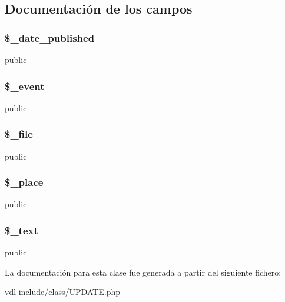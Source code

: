 \subsection{Documentación de los campos}
\hypertarget{class_u_p_d_a_t_e_a18eb2ed8e237cc8ea4ab9beff2ac576a}{
\subsubsection[{\$\-\_\-date\-\_\-published}]{\setlength{\rightskip}{0pt plus 5cm}\$\-\_\-date\-\_\-published}}\label{class_u_p_d_a_t_e_a18eb2ed8e237cc8ea4ab9beff2ac576a}
public \hypertarget{class_u_p_d_a_t_e_ad6c677c9355a932f4eb84a01ddf072c4}{
\subsubsection[{\$\-\_\-event}]{\setlength{\rightskip}{0pt plus 5cm}\$\-\_\-event}}\label{class_u_p_d_a_t_e_ad6c677c9355a932f4eb84a01ddf072c4}
public \hypertarget{class_u_p_d_a_t_e_abddaf0b77086e2b7d920f5d1a9616889}{
\subsubsection[{\$\-\_\-file}]{\setlength{\rightskip}{0pt plus 5cm}\$\-\_\-file}}\label{class_u_p_d_a_t_e_abddaf0b77086e2b7d920f5d1a9616889}
public \hypertarget{class_u_p_d_a_t_e_a7c2710f8add9b3b64b8f85f8d06d3687}{
\subsubsection[{\$\-\_\-place}]{\setlength{\rightskip}{0pt plus 5cm}\$\-\_\-place}}\label{class_u_p_d_a_t_e_a7c2710f8add9b3b64b8f85f8d06d3687}
public \hypertarget{class_u_p_d_a_t_e_a30dbc932171e87783bf0630dcdb5ad36}{
\subsubsection[{\$\-\_\-text}]{\setlength{\rightskip}{0pt plus 5cm}\$\-\_\-text}}\label{class_u_p_d_a_t_e_a30dbc932171e87783bf0630dcdb5ad36}
public 

La documentación para esta clase fue generada a partir del siguiente fichero\-:\begin{DoxyCompactItemize}
\item 
vdl-\/include/class/U\-P\-D\-A\-T\-E.\-php\end{DoxyCompactItemize}
